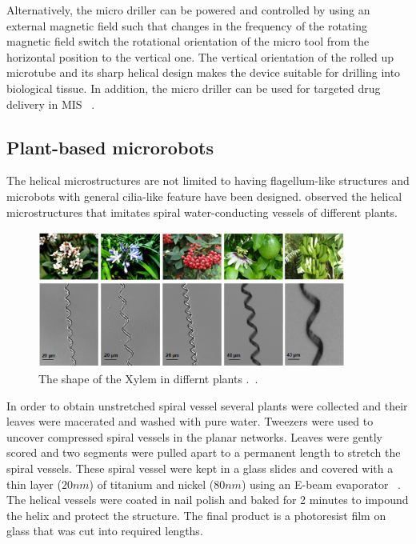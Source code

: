 \documentclass[12pt,a4paper,titlepage]{report}
\newcommand{\hilight}[1]{\colorbox{yellow}{#1}}
\begin{document}
Alternatively, the micro driller can be powered and controlled by using an external magnetic field 
such that changes in the frequency of the rotating magnetic field switch the rotational orientation of the 
micro tool from the horizontal position to the vertical one. The vertical orientation of the rolled up microtube 
and its sharp helical design makes the device suitable for drilling into biological tissue. In addition, the micro 
driller can be used for targeted drug delivery in MIS ~\citep{C2NR32798H}. 


\subsection{Plant-based microrobots}
The helical microstructures are not limited to having flagellum-like structures and microbots with
general cilia-like feature have been designed. \citeauthor{gao2013bioinspired}
 observed the helical microstructures that imitates spiral water-conducting vessels of different plants. 

\begin{figure}
  \centering
    \includegraphics[width=0.9\textwidth]{plants}
  \caption{The shape of the Xylem in differnt plants .~\citep{mahoney2011velocity}.}
  \label{plants}
\end{figure}

In order to obtain unstretched spiral vessel several plants were collected and their leaves were 
macerated and washed with pure water. Tweezers were used to uncover compressed spiral vessels 
in the planar networks. Leaves were gently scored and two segments were pulled apart to a permanent
 length to stretch the spiral vessels. These spiral vessel were kept in a glass slides and covered with a 
thin layer ($20 nm$) of titanium and nickel ($80 nm$) using an 
E-beam evaporator ~\citep{mahoney2011velocity}. The helical vessels were coated in nail 
polish and baked for 2 minutes to impound the helix and protect the structure. The final product is 
a photoresist film on glass that was cut into required lengths.      
  
\end{document}
